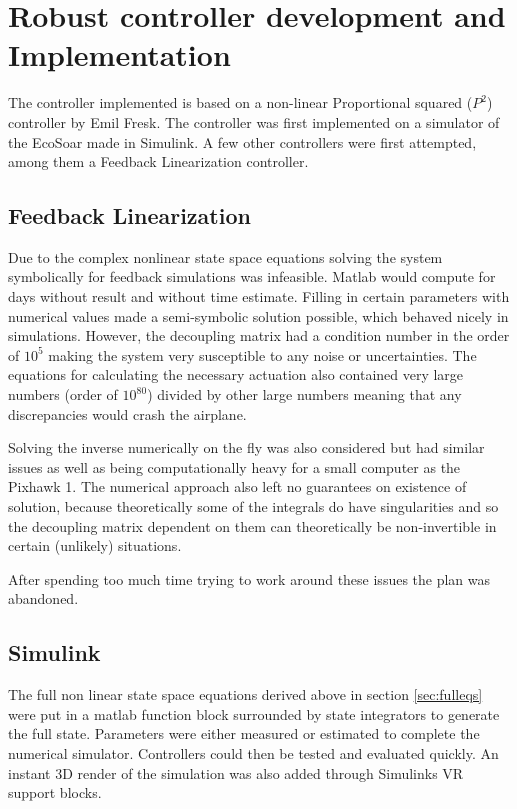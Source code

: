 \documentclass{article}
\begin{document}
\section{\textbf{Robust controller development and Implementation}}

The controller implemented is based on a non-linear Proportional squared ($P^2$) controller by Emil Fresk\cite{P2}.
The controller was first implemented on a simulator of the EcoSoar made in Simulink.
A few other controllers were first attempted, among them a Feedback Linearization controller.

\subsection{Feedback Linearization}
Due to the complex nonlinear state space equations solving the system symbolically for feedback simulations was infeasible.
Matlab would compute for days without result and without time estimate.
Filling in certain parameters with numerical values made a semi-symbolic solution possible, which behaved nicely in simulations.
However, the decoupling matrix had a condition number in the order of $10^5$ making the system very susceptible to any noise or uncertainties.
The equations for calculating the necessary actuation also contained very large numbers (order of $10^{80}$) divided by other large numbers meaning that any discrepancies would crash the airplane.

Solving the inverse numerically on the fly was also considered but had similar issues as well as being computationally heavy for a small computer as the Pixhawk 1.
The numerical approach also left no guarantees on existence of solution, because theoretically some of the integrals do have singularities and so the decoupling matrix dependent on them can theoretically be non-invertible in certain (unlikely) situations.

After spending too much time trying to work around these issues the plan was abandoned.


\subsection{Simulink}
The full non linear state space equations derived above in section \ref{sec:fulleqs} were put in a matlab function block surrounded by state integrators to generate the full state.
Parameters were either measured or estimated to complete the numerical simulator.
Controllers could then be tested and evaluated quickly.
An instant 3D render of the simulation was also added through Simulinks VR support blocks.
\end{document}
